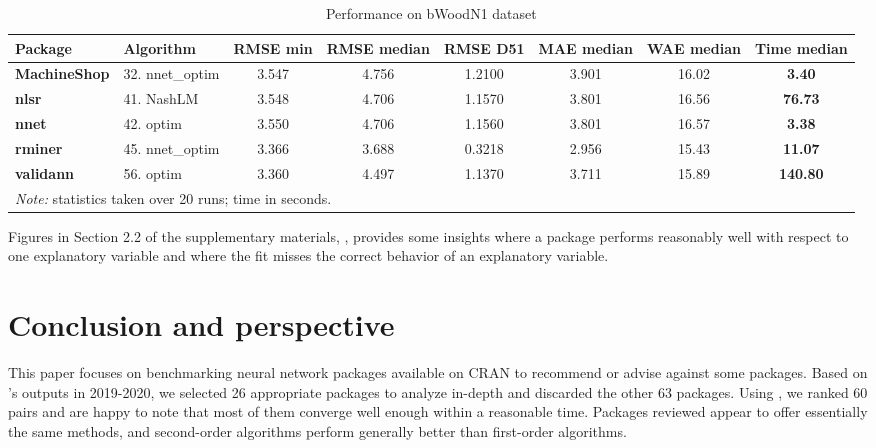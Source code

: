 \begin{Schunk}
\begin{table}

\caption{\label{tab:unnamed-chunk-4}Performance on bWoodN1 dataset}
\centering
\fontsize{7}{9}\selectfont
\begin{tabular}[t]{>{}llccccc>{}c}
\toprule
Package & Algorithm & RMSE min & RMSE median & RMSE D51 & MAE median & WAE median & Time median\\
\midrule
\textbf{MachineShop} & 32. nnet\_optim & 3.547 & 4.756 & 1.2100 & 3.901 & 16.02 & \textbf{3.40}\\
\textbf{nlsr} & 41. NashLM & 3.548 & 4.706 & 1.1570 & 3.801 & 16.56 & \textbf{76.73}\\
\textbf{nnet} & 42. optim & 3.550 & 4.706 & 1.1560 & 3.801 & 16.57 & \textbf{3.38}\\
\textbf{rminer} & 45. nnet\_optim & 3.366 & 3.688 & 0.3218 & 2.956 & 15.43 & \textbf{11.07}\\
\textbf{validann} & 56. optim & 3.360 & 4.497 & 1.1370 & 3.711 & 15.89 & \textbf{140.80}\\
\bottomrule
\multicolumn{8}{l}{\rule{0pt}{1em}\textit{Note: } statistics taken over 20 runs; time in seconds.}\\
\end{tabular}
\end{table}

\end{Schunk}

Figures in Section 2.2 of the supplementary materials,
\citep{suppl:material:paper}, provides some insights where a package
performs reasonably well with respect to one explanatory variable and
where the fit misses the correct behavior of an explanatory variable.

\hypertarget{conclusion-and-perspective}{%
\section{Conclusion and perspective}\label{conclusion-and-perspective}}

This paper focuses on benchmarking neural network packages available on
CRAN to recommend or advise against some packages. Based on
's outputs in 2019-2020, we selected 26 appropriate
packages to analyze in-depth and discarded the other 63 packages. Using
, we ranked 60  pairs and are
happy to note that most of them converge well enough within a reasonable
time. Packages reviewed appear to offer essentially the same methods,
and second-order algorithms perform generally better than first-order
algorithms.

